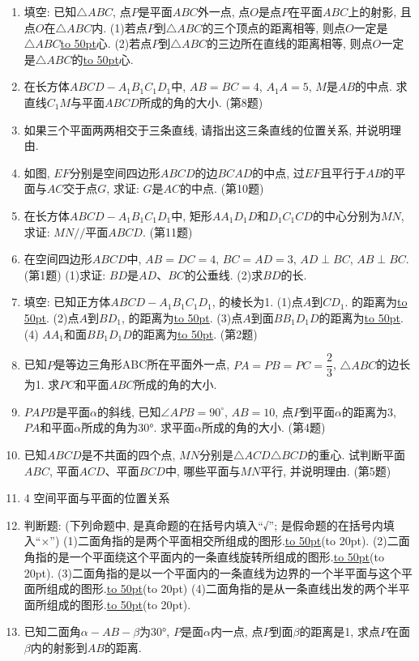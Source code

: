\documentclass[10pt,a4paper]{article}
\newcommand{\blank}[1]{\underline{\hbox to #1pt{}}}
\newcommand{\bracket}[1]{(\hbox to #1pt{})}
\begin{document}
\begin{enumerate}[1.]
\item 填空:
已知$\triangle ABC$, 点$P$是平面$ABC$外一点, 点$O$是点$P$在平面$ABC$上的射影, 且点$O$在$\triangle ABC$内.
(1)若点$P$到$\triangle ABC$的三个顶点的距离相等, 则点$O$一定是$\triangle ABC$\blank{50}心.
(2)若点$P$到$\triangle ABC$的三边所在直线的距离相等, 则点$O$一定是$\triangle ABC$的\blank{50}心.
\item 在长方体$ABCD-A_1B_1C_1D_1$中, $AB=BC=4$, $A_1A=5$, $M$是$AB$的中点. 求直线$C_1M$与平面$ABCD$所成的角的大小.
(第8题)
\item 如果三个平面两两相交于三条直线, 请指出这三条直线的位置关系, 并说明理由.
\item 如图, $EF$分别是空间四边形$ABCD$的边$BCAD$的中点, 过$EF$且平行于$AB$的平面与$AC$交于点$G$, 求证: $G$是$AC$的中点.
(第10题)
\item 在长方体$ABCD-A_1B_1C_1D_1$中, 矩形$AA_1D_1D$和$D_1C_1CD$的中心分别为$MN$, 求证: $MN//$平面$ABCD$.
(第11题)
\item 在空间四边形$ABCD$中, $AB=DC=4$, $BC=AD=3$, $AD\perp BC$, $AB\perp BC$.
(第1题)
(1)求证: $BD$是$AD$、$BC$的公垂线.
(2)求$BD$的长.
\item 填空:
已知正方体$ABCD-A_1B_1C_1D_1$, 的棱长为1.
(1)点$A$到$CD_1$. 的距离为\blank{50}.
(2)点$A$到$BD_1$, 的距离为\blank{50}.
(3)点$A$到面$BB_1D_1D$的距离为\blank{50}.
(4) $AA_1$和面$BB_1D_1D$的距离为\blank{50}.
(第2题)
\item 已知$P$是等边三角形ABC所在平面外一点, $PA=PB=PC=\dfrac 23$, $\triangle ABC$的边长为1. 求$PC$和平面$ABC$所成的角的大小.
\item $PAPB$是平面$\alpha$的斜线, 已知$\angle APB=90^\circ$, $AB=10$, 点$P$到平面$\alpha$的距离为3, $PA$和平面$\alpha$所成的角为30°. 求平面$\alpha$所成的角的大小.
(第4题)
\item 已知$ABCD$是不共面的四个点, $MN$分别是$\triangle ACD\triangle BCD$的重心. 试判断平面$ABC$, 平面$ACD$、平面$BCD$中, 哪些平面与$MN$平行, 并说明理由.
(第5题)
\item 4  空间平面与平面的位置关系
\item 判断题: (下列命题中, 是真命题的在括号内填入``√''; 是假命题的在括号内填入``×'')
(1)二面角指的是两个平面相交所组成的图形.\blank{50}\bracket{20}.
(2)二面角指的是一个平面绕这个平面内的一条直线旋转所组成的图形.\blank{50}\bracket{20}.
(3)二面角指的是以一个平面内的一条直线为边界的一个半平面与这个平面所组成的图形.\blank{50}\bracket{20}
(4)二面角指的是从一条直线出发的两个半平面所组成的图形.\blank{50}\bracket{20}.
\item 已知二面角$\alpha -AB-\beta$为30°, $P$是面$\alpha$内一点, 点$P$到面$\beta$的距离是1, 求点$P$在面$\beta$内的射影到$AB$的距离.

\end{enumerate}
\end{document}
